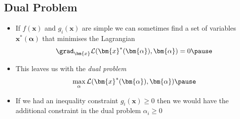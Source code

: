 
\begin{slide}
\section{Dual Problem}

\begin{PauseHighLight}
  \begin{itemize}
  \item If $f(\bm{x})$ and $g_i(\bm{x})$ are simple we can sometimes
    find a set of variables $\bm{x}^*(\bm{\alpha})$ that minimises the
    Lagrangian
    \begin{align*}
      \grad_{\bm{x}} \mathcal{L}(\bm{x}^*(\bm{\alpha}),\bm{\alpha}) = 0\pause
    \end{align*}
  \item This leaves us with the \emph{dual problem}
    \begin{align*}
      \max_\alpha \mathcal{L}(\bm{x}^*(\bm{\alpha}),\bm{\alpha})\pause
    \end{align*}
  \item If we had an inequality constraint $g_i(\bm{x})\geq 0$ then we
    would have the additional constraint in the dual problem
    $\alpha_i\geq0$\pause
  \end{itemize}
\end{PauseHighLight}

\end{slide}


